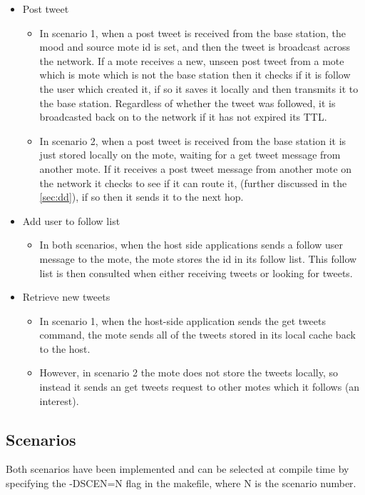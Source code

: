 \documentclass{article}
\begin{document}
\begin{itemize}
\begin{itemize}
		\begin{itemize}
			\item Post tweet
			\begin{itemize}
			 	\item In scenario 1, when a post tweet is received from the base station, the mood and source mote id is set, and then the tweet is broadcast across the network. If a mote receives a new, unseen post tweet from a mote which is mote which is not the base station then it checks if it is follow the user which created it, if so it saves it locally and then transmits it to the base station. Regardless of whether the tweet was followed, it is broadcasted back on to the network if it has not expired its TTL.
			 	\item In scenario 2, when a post tweet is received from the base station it is just stored locally on the mote, waiting for a get tweet message from another mote. If it receives a post tweet message from another mote on the network it checks to see if it can route it, (further discussed in the \ref{sec:dd}), if so then it sends it to the next hop.
			\end{itemize} 
			\item Add user to follow list
			\begin{itemize}
			 	\item In both scenarios, when the host side applications sends a follow user message to the mote, the mote stores the id in its follow list. This follow list is then consulted when either receiving tweets or looking for tweets. 
			 \end{itemize} 
			 \item Retrieve new tweets
			 \begin{itemize}
			 	\item In scenario 1, when the host-side application sends the get tweets command, the mote sends all of the tweets stored in its local cache back to the host.
			 	\item However, in scenario 2 the mote does not store the tweets locally, so instead it sends an get tweets request to other motes which it follows (an interest).
			 \end{itemize}
		\end{itemize}

	\end{itemize}
\end{itemize}

\subsection{Scenarios}
Both scenarios have been implemented and can be selected at compile time by specifying the -DSCEN=N flag in the makefile, where N is the scenario number.
\end{document}
